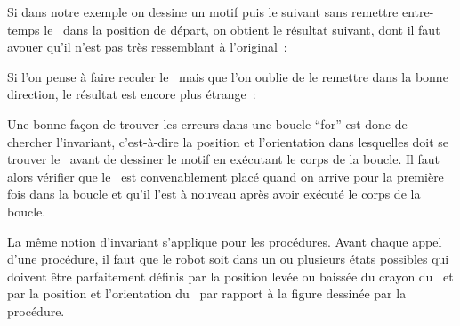 Si dans notre exemple on dessine un motif puis le suivant sans remettre entre-temps
le \robot\ dans la position de départ, on obtient le résultat suivant, dont
il faut avouer qu'il n'est pas très ressemblant à l'original~:\\[5cm]
%
\vspace*{-5cm}


Si l'on pense à faire reculer le \robot\ mais que l'on oublie de le remettre
dans la bonne direction, le résultat est encore plus étrange~:\\[25mm]
%
\vspace*{-25mm}


Une bonne façon de trouver les erreurs dans une boucle ``for'' est donc
de chercher l'invariant, c'est-à-dire la position et l'orientation dans
lesquelles doit se trouver le \robot\ avant de dessiner le motif en 
exécutant le corps de la boucle. Il faut alors vérifier que le \robot\ est
convenablement placé quand on arrive pour la première fois dans la boucle
et qu'il l'est à nouveau après avoir exécuté le corps de la boucle.

La même notion d'invariant s'applique pour les procédures. Avant chaque
appel d'une procédure, il faut que le robot soit dans un ou plusieurs
états possibles qui doivent être parfaitement définis par la position 
levée ou baissée du crayon du \robot\ et par la position et l'orientation
du \robot\ par rapport à la figure dessinée par la procédure.

